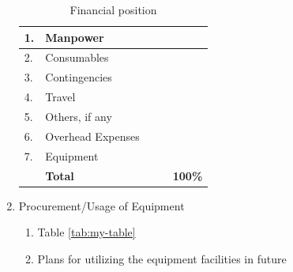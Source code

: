 \documentclass{article}
\begin{document}
\begin{enumerate}
\begin{table}[]
\begin{tabular}{|l|l|l|l|l|}
        1.           & Manpower             &                          &                      &                           \\ \hline
        2.           & Consumables          &                          &                      &                           \\ \hline
        3.           & Contingencies        &                          &                      &                           \\ \hline
        4.           & Travel               &                          &                      &                           \\ \hline
        5.           & Others, if any       &                          &                      &                           \\ \hline
        6.           & Overhead Expenses    &                          &                      &                           \\ \hline
        7.           & Equipment            &                          &                      &                           \\ \hline
                     & \textbf{Total}       &                          &                      & \textbf{100\%}            \\ \hline
        \end{tabular}
        \caption{Financial position}
        \label{tab:my-table1}
        \end{table}
    \item Procurement/Usage of Equipment
    \begin{enumerate}
        \item Table \ref{tab:my-table}
\begin{table}[h!]
\centering
{}
\caption{Procurement}
\label{tab:my-table}
\end{table}
        \item Plans for utilizing the equipment facilities in future
    \end{enumerate}
\end{enumerate}
\end{document}
